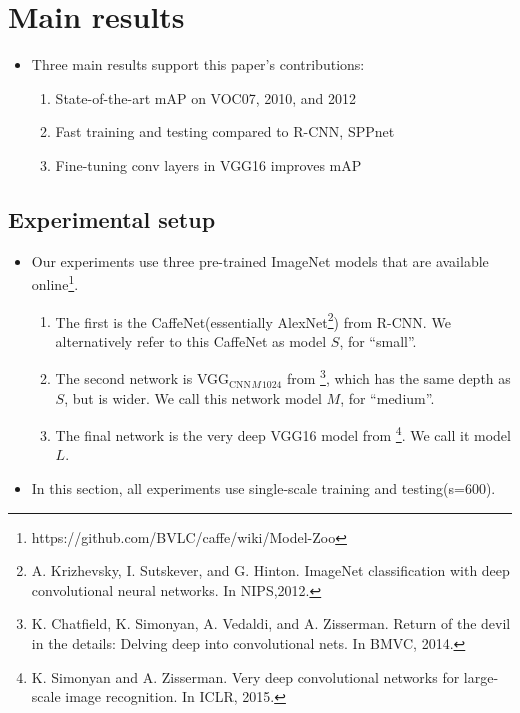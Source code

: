 \documentclass[11pt]{book}
\begin{document}
\chapter{Main results}
\label{sec-1-3}


\begin{itemize}
\item Three main results support this paper's contributions:
\begin{enumerate}
\item State-of-the-art mAP on VOC07, 2010, and 2012
\item Fast training and testing compared to R-CNN, SPPnet
\item Fine-tuning conv layers in VGG16 improves mAP
\end{enumerate}
\end{itemize}
\section{Experimental setup}
\label{sec-1-3-1}

\begin{itemize}
\item Our experiments use three pre-trained ImageNet models that are available online\footnote{https://github.com/BVLC/caffe/wiki/Model-Zoo
 }.
\begin{enumerate}
\item The first is the CaffeNet(essentially AlexNet\footnote{A. Krizhevsky, I. Sutskever, and G. Hinton.  
ImageNet classification with deep convolutional neural networks. 
In NIPS,2012.
 }) from R-CNN\footnotemark[1]. We alternatively
         refer to this CaffeNet as model $S$, for ``small''.
\item The second network is VGG$_{\mathrm{CNN}}$$_M$$_{\mathrm{1024}}$ from \footnote{K. Chatfield, K. Simonyan, A. Vedaldi, and A. Zisserman.
Return of the devil in the details:  Delving deep into convolutional nets. 
In BMVC, 2014.
 }, which has the same depth as $S$,
         but is wider. We call this network model $M$, for ``medium''.
\item The final network is the very deep VGG16 model from \footnote{K.  Simonyan  and  A.  Zisserman.   
Very  deep  convolutional networks for large-scale image recognition.  
In ICLR, 2015.
 }. We call  it model $L$.
\end{enumerate}
\item In this section, all experiments use single-scale training and testing(s=600).
\end{itemize}
\end{document}
